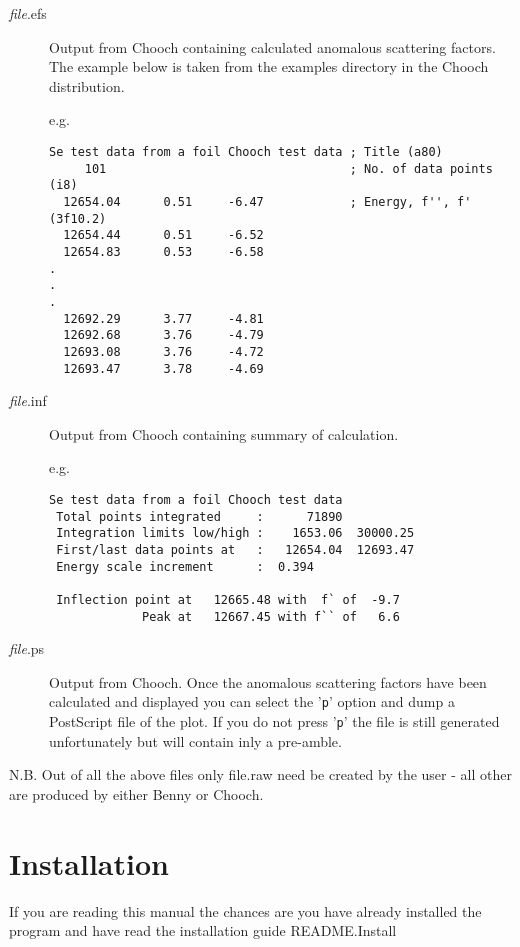 \documentclass[a4]{article}
\begin{document}
\begin{description}
\item[{\it file}.efs] Output from {\sc Chooch} containing calculated
anomalous scattering factors. The example below is taken from the
examples directory in the {\sc Chooch} distribution.

e.g.

\begin{verbatim}
Se test data from a foil Chooch test data ; Title (a80)
     101                                  ; No. of data points (i8)
  12654.04      0.51     -6.47            ; Energy, f'', f' (3f10.2)
  12654.44      0.51     -6.52
  12654.83      0.53     -6.58
.
.
.
  12692.29      3.77     -4.81
  12692.68      3.76     -4.79
  12693.08      3.76     -4.72
  12693.47      3.78     -4.69
\end{verbatim}

\item[{\it file}.inf] Output from {\sc Chooch} containing summary of
calculation. 

e.g.

\begin{verbatim}
Se test data from a foil Chooch test data                                       
 Total points integrated     :      71890
 Integration limits low/high :    1653.06  30000.25
 First/last data points at   :   12654.04  12693.47
 Energy scale increment      :  0.394

 Inflection point at   12665.48 with  f` of  -9.7
             Peak at   12667.45 with f`` of   6.6
\end{verbatim}

\item[{\it file}.ps] Output from {\sc Chooch}. Once the anomalous scattering
factors have been calculated and displayed you can select the '{\tt p}' option
and dump a {\sc PostScript} file of the plot. If you do not press '{\tt p}' the file is
still generated unfortunately but will contain inly a pre-amble.

\end{description}


N.B. Out of all the above files only file.raw need be created by the user - all 
other are produced by either {\sc Benny} or {\sc Chooch}.

\section{Installation}

If you are reading this manual the chances are you have already installed the
program and have read the installation guide README.Install
\end{document}

